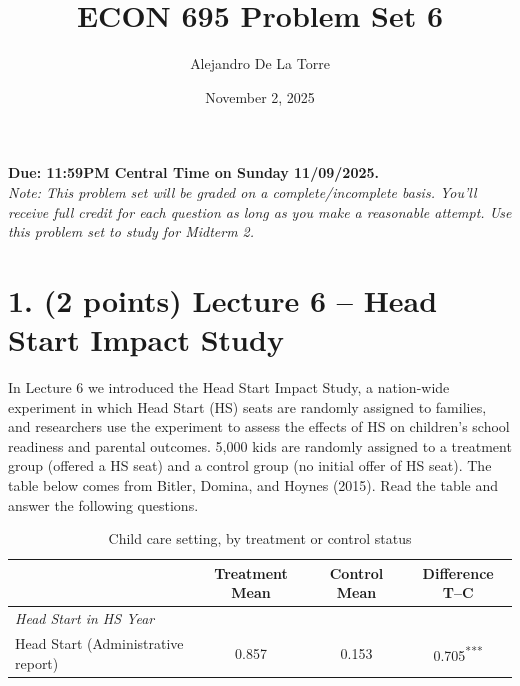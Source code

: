 \documentclass[12pt]{article}
\title{ECON 695 Problem Set 6}
\author{Alejandro De La Torre}
\date{November 2, 2025}
\begin{document}
\maketitle

\noindent\textbf{Due: 11:59PM Central Time on Sunday 11/09/2025.}\\
\emph{Note: This problem set will be graded on a complete/incomplete basis. You’ll receive full credit for each question as long as you make a reasonable attempt. Use this problem set to study for Midterm 2.}

\bigskip

\section*{1. (2 points) Lecture 6 -- Head Start Impact Study}
In Lecture 6 we introduced the Head Start Impact Study, a nation-wide experiment in which Head Start (HS) seats are randomly assigned to families, and researchers use the experiment to assess the effects of HS on children’s school readiness and parental outcomes. 5,000 kids are randomly assigned to a treatment group (offered a HS seat) and a control group (no initial offer of HS seat). The table below comes from Bitler, Domina, and Hoynes (2015). Read the table and answer the following questions.

\begin{table}[h!]
  \centering
  \caption{Child care setting, by treatment or control status}
  \label{tab:hs_table2}
  \begin{tabular}{l S S S}
    \toprule
    & {Treatment Mean} & {Control Mean} & {Difference T--C} \\
    \midrule
    \emph{Head Start in HS Year} & & & \\
    Head Start (Administrative report) & 0.857 & 0.153 & 0.705\textsuperscript{***} \\
    \bottomrule
  \end{tabular}
\end{table}
\end{document}
